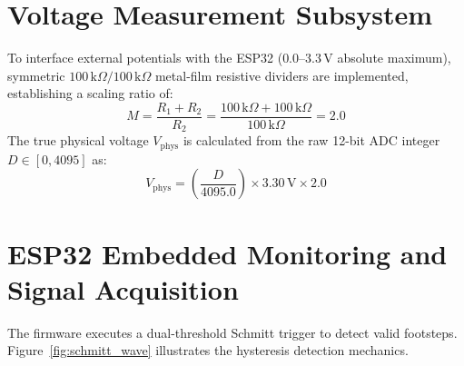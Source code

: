 \section{Voltage Measurement Subsystem}
To interface external potentials with the ESP32 ($0.0\text{--}3.3\,\text{V}$ absolute maximum), symmetric $100\,\text{k}\Omega / 100\,\text{k}\Omega$ metal-film resistive dividers are implemented, establishing a scaling ratio of:
\begin{equation}
M = \frac{R_1 + R_2}{R_2} = \frac{100\,\text{k}\Omega + 100\,\text{k}\Omega}{100\,\text{k}\Omega} = 2.0
\label{eq:divider_ratio}
\end{equation}
The true physical voltage $V_{\text{phys}}$ is calculated from the raw 12-bit ADC integer $D \in [0, 4095]$ as:
\begin{equation}
V_{\text{phys}} = \left(\frac{D}{4095.0}\right) \times 3.30\,\text{V} \times 2.0
\label{eq:adc_conversion}
\end{equation}

\section{ESP32 Embedded Monitoring and Signal Acquisition}
The firmware executes a dual-threshold Schmitt trigger to detect valid footsteps. Figure~\ref{fig:schmitt_wave} illustrates the hysteresis detection mechanics.

